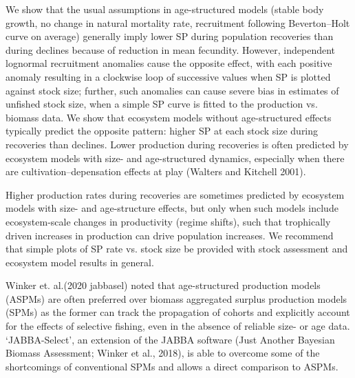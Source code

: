 \documentclass[12pt,doublespacing,a4paper]{ouparticle}
\begin{document}
We show that the usual assumptions in age-structured models (stable body growth, no change in natural mortality rate, recruitment following Beverton–Holt curve on average) generally imply lower SP during population recoveries than during declines because of reduction in mean fecundity. However, independent lognormal recruitment anomalies cause the opposite effect, with each positive anomaly resulting in a clockwise loop of successive values when SP is plotted against stock size; further, such anomalies can cause severe bias in estimates of unfished stock size, when a simple SP curve is fitted to the production vs. biomass data. We show that ecosystem models without age-structured effects typically predict the opposite pattern: higher SP at each stock size during recoveries than declines. Lower production during recoveries is often predicted by ecosystem models with size- and age-structured dynamics, especially when there are cultivation–depensation effects at play (Walters and Kitchell 2001). 

Higher production rates during recoveries are sometimes predicted by ecosystem models with size- and age-structure effects, but only when such models include ecosystem-scale changes in productivity (regime shifts), such that trophically driven increases in production can drive population increases. We recommend that simple plots of SP rate vs. stock size be provided with stock assessment and ecosystem model results in general.

Winker et. al.(2020 jabbasel) noted that age-structured production models (ASPMs) are often preferred over biomass aggregated surplus production models (SPMs) as the former can track the propagation of cohorts and explicitly account for the effects of selective fishing, even in the absence of reliable size- or age data. ‘JABBA-Select’, an extension of the JABBA software (Just Another Bayesian Biomass Assessment; Winker et al., 2018), is able to overcome some of the shortcomings of conventional SPMs and allows a direct comparison to ASPMs. 
\end{document}
